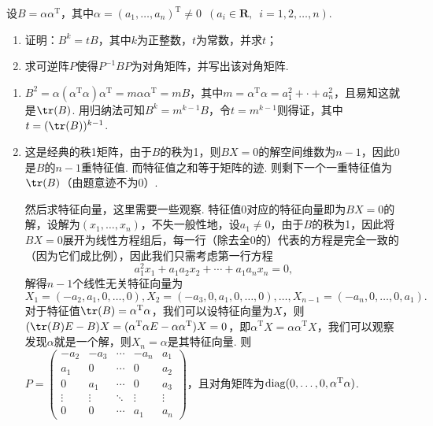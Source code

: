 \begin{exercise}
\begin{exgroup}
        \item 设$B=\alpha\alpha^\mathrm{T}$，其中$\alpha=(a_1,\ldots,a_n)^\mathrm{T}\neq 0\enspace(a_i\in\mathbf{R},\enspace i=1,2,\ldots,n)$.
        \begin{enumerate}
            \item 证明：$B^k=tB$，其中$k$为正整数，$t$为常数，并求$t$；

            \item 求可逆阵$P$使得$P^{-1}BP$为对角矩阵，并写出该对角矩阵.
        \end{enumerate}
        \begin{answer}
            \begin{enumerate}
                \item $B^2=\alpha(\alpha^\mathrm{T}\alpha)\alpha^\mathrm{T}=m\alpha\alpha^\mathrm{T}=mB$，其中$m=\alpha^\mathrm{T}\alpha=a_1^2+\cdot+a_n^2$，且易知这就是$\tr(B)$. 用归纳法可知$B^k=m^{k-1}B$，令$t=m^{k-1}$则得证，其中$t=(\tr(B))^{k-1}$.

                \item 这是经典的秩1矩阵，由于$B$的秩为1，则$BX=0$的解空间维数为$n-1$，因此0是$B$的$n-1$重特征值. 而特征值之和等于矩阵的迹. 则剩下一个一重特征值为$\tr(B)$（由题意迹不为0）.

                      然后求特征向量，这里需要一些观察. 特征值0对应的特征向量即为$BX=0$的解，设解为$(x_1,\ldots,x_n)$，不失一般性地，设$a_1\neq 0$，由于$B$的秩为1，因此将$BX=0$展开为线性方程组后，每一行（除去全0的）代表的方程是完全一致的（因为它们成比例），因此我们只需考虑第一行方程
                      \[a_1^2x_1+a_1a_2x_2+\cdots+a_1a_nx_n=0,\]
                      解得$n-1$个线性无关特征向量为
                      \[X_1=(-a_2,a_1,0,\ldots,0),X_2=(-a_3,0,a_1,0,\ldots,0),\ldots,X_{n-1}=(-a_n,0,\ldots,0,a_1).\]
                      对于特征值$\tr(B)=\alpha^\mathrm{T}\alpha$，我们可以设特征向量为$X$，则$(\tr(B)E-B)X=(\alpha^\mathrm{T}\alpha E-\alpha\alpha^\mathrm{T})X=0$，即$\alpha^\mathrm{T}X=\alpha\alpha^\mathrm{T}X$，我们可以观察发现$\alpha$就是一个解，则$X_n=\alpha$是其特征向量. 则$P=\begin{pmatrix}
                              -a_2 & -a_3 & \cdots & -a_n & a_1 \\ a_1 & 0 & \cdots & 0 & a_2 \\ 0 & a_1 & \cdots & 0 & a_3 \\ \vdots & \vdots & \ddots & \vdots & \vdots \\ 0 & 0 & \cdots & a_1 & a_n
                          \end{pmatrix}$，且对角矩阵为$\operatorname{diag}(0,\ldots,0,\alpha^\mathrm{T}\alpha)$.
            \end{enumerate}
        \end{answer}


\end{exgroup}
\end{exercise}

